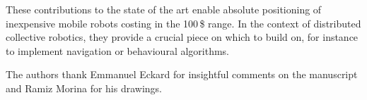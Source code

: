 \documentclass{svmult}
\begin{document}
These contributions to the state of the art enable absolute positioning of inexpensive mobile robots costing in the 100\,\$ range.
In the context of distributed collective robotics, they provide a crucial piece on which to build on, for instance to implement navigation or behavioural algorithms.

\begin{acknowledgement}
The authors thank Emmanuel Eckard for insightful comments on the manuscript and Ramiz Morina for his drawings.
\end{acknowledgement}



\end{document}
